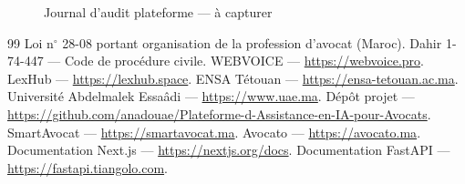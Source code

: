 \begin{figure}[H]
\centering
{}
\caption{Journal d'audit plateforme --- à capturer}
\label{fig:adminaudit}
\end{figure}

\begin{thebibliography}{99}
 Loi n$^{\circ}$ 28-08 portant organisation de la profession d'avocat (Maroc).
 Dahir 1-74-447 --- Code de procédure civile.
 WEBVOICE --- \url{https://webvoice.pro}.
 LexHub --- \url{https://lexhub.space}.
 ENSA Tétouan --- \url{https://ensa-tetouan.ac.ma}.
 Université Abdelmalek Essaâdi --- \url{https://www.uae.ma}.
 Dépôt projet --- \url{https://github.com/anadouae/Plateforme-d-Assistance-en-IA-pour-Avocats}.
 SmartAvocat --- \url{https://smartavocat.ma}.
 Avocato --- \url{https://avocato.ma}.
 Documentation Next.js --- \url{https://nextjs.org/docs}.
 Documentation FastAPI --- \url{https://fastapi.tiangolo.com}.
\end{thebibliography}
